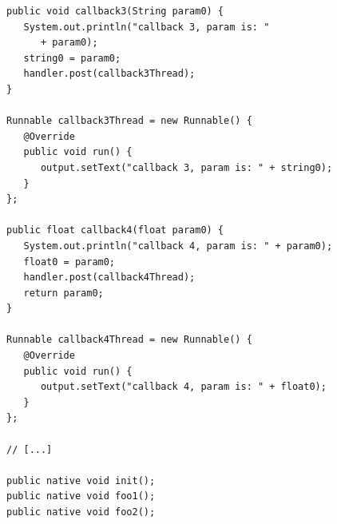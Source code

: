 \documentclass[a4paper,10pt]{article}
\begin{document}
\begin{multicols}{2}
\begin{lstlisting}
public void callback3(String param0) {
   System.out.println("callback 3, param is: "
      + param0);
   string0 = param0;
   handler.post(callback3Thread);
}

Runnable callback3Thread = new Runnable() {
   @Override
   public void run() {
      output.setText("callback 3, param is: " + string0);
   }
};

public float callback4(float param0) {
   System.out.println("callback 4, param is: " + param0);
   float0 = param0;
   handler.post(callback4Thread);
   return param0;
}

Runnable callback4Thread = new Runnable() {
   @Override
   public void run() {
      output.setText("callback 4, param is: " + float0);
   }
};

// [...]

public native void init();
public native void foo1();
public native void foo2();


\end{lstlisting}
\end{multicols}
\end{document}

